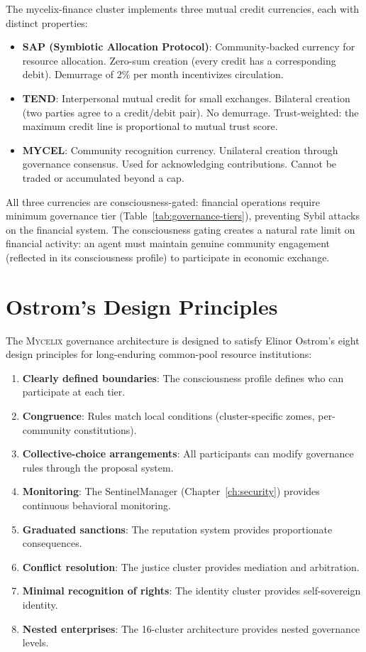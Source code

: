 \documentclass[12pt]{book}
\newcommand{\mycelix}{\textsc{Mycelix}}
\begin{document}
The mycelix-finance cluster implements three mutual credit currencies, each with distinct properties:

\begin{itemize}
  \item \textbf{SAP (Symbiotic Allocation Protocol)}: Community-backed currency for resource allocation. Zero-sum creation (every credit has a corresponding debit). Demurrage of 2\% per month incentivizes circulation.
  \item \textbf{TEND}: Interpersonal mutual credit for small exchanges. Bilateral creation (two parties agree to a credit/debit pair). No demurrage. Trust-weighted: the maximum credit line is proportional to mutual trust score.
  \item \textbf{MYCEL}: Community recognition currency. Unilateral creation through governance consensus. Used for acknowledging contributions. Cannot be traded or accumulated beyond a cap.
\end{itemize}

All three currencies are consciousness-gated: financial operations require minimum governance tier (Table~\ref{tab:governance-tiers}), preventing Sybil attacks on the financial system. The consciousness gating creates a natural rate limit on financial activity: an agent must maintain genuine community engagement (reflected in its consciousness profile) to participate in economic exchange.

\section{Ostrom's Design Principles}

The \mycelix{} governance architecture is designed to satisfy Elinor Ostrom's eight design principles for long-enduring common-pool resource institutions:

\begin{enumerate}
  \item \textbf{Clearly defined boundaries}: The consciousness profile defines who can participate at each tier.
  \item \textbf{Congruence}: Rules match local conditions (cluster-specific zomes, per-community constitutions).
  \item \textbf{Collective-choice arrangements}: All participants can modify governance rules through the proposal system.
  \item \textbf{Monitoring}: The SentinelManager (Chapter~\ref{ch:security}) provides continuous behavioral monitoring.
  \item \textbf{Graduated sanctions}: The reputation system provides proportionate consequences.
  \item \textbf{Conflict resolution}: The justice cluster provides mediation and arbitration.
  \item \textbf{Minimal recognition of rights}: The identity cluster provides self-sovereign identity.
  \item \textbf{Nested enterprises}: The 16-cluster architecture provides nested governance levels.
\end{enumerate}
\end{document}
